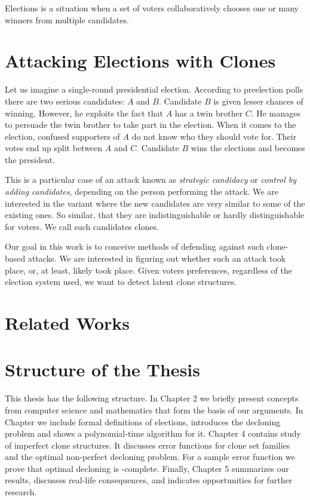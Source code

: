 Elections is a situation when a set of voters collaboratively chooses one or many winners from multiple candidates.

\section{Attacking Elections with Clones}

Let us imagine a single-round presidential election.
According to preelection polls there are two serious candidates: $A$ and $B$.
Candidate $B$ is given lesser chances of winning.
However, he exploits the fact that $A$ has a twin brother $C$.
He manages to persuade the twin brother to take part in the election.
When it comes to the election, confused supporters of $A$ do not know who they should vote for.
Their votes end up split between $A$ and $C$.
Candidate $B$ wins the elections and becomes the president.

This is a particular case of an attack known as \textit{strategic candidacy} or \textit{control by adding candidates},
depending on the person performing the attack.
We are interested in the variant where the new candidates are very similar to some of the existing ones.
So similar, that they are indistinguishable or hardly distinguishable for voters.
We call such candidates clones.

Our goal in this work is to conceive methods of defending against such clone-based attacks.
We are interested in figuring out whether such an attack took place, or, at least, likely took place.
Given voters preferences, regardless of the election system used, we want to detect latent clone structures.

\section{Related Works}


\section{Structure of the Thesis}

This thesis has the following structure.
In Chapter 2 we briefly present concepts from computer science
and mathematics that form the basis of our arguments.
In Chapter we include formal definitions of elections, introduces the decloning problem
and shows a polynomial-time algorithm for it.
Chapter 4 contains study of imperfect clone structures.
It discusses error functions for clone set families and the optimal non-perfect decloning problem.
For a sample error function we prove that optimal decloning is \np-complete.
Finally, Chapter 5 summarizes our results, discusses real-life consequences,
and indicates opportunities for further research.
